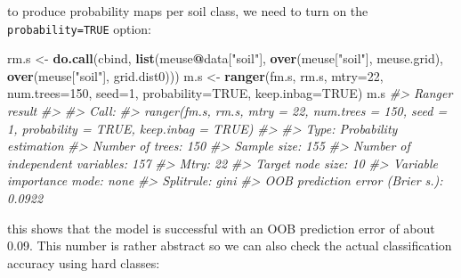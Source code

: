 \documentclass[graybox,natbib,nospthms,UStrade]{svmono}
\newenvironment{Shaded}{\begin{snugshade}}{\end{snugshade}}
\newcommand{\CommentTok}[1]{\textcolor[rgb]{0.37,0.37,0.37}{\textit{#1}}}
\newcommand{\DataTypeTok}[1]{\textcolor[rgb]{0.27,0.27,0.27}{#1}}
\newcommand{\DecValTok}[1]{\textcolor[rgb]{0.06,0.06,0.06}{#1}}
\newcommand{\KeywordTok}[1]{\textcolor[rgb]{0.27,0.27,0.27}{\textbf{#1}}}
\newcommand{\NormalTok}[1]{#1}
\newcommand{\OperatorTok}[1]{\textcolor[rgb]{0.43,0.43,0.43}{\textbf{#1}}}
\newcommand{\OtherTok}[1]{\textcolor[rgb]{0.37,0.37,0.37}{#1}}
\newcommand{\StringTok}[1]{\textcolor[rgb]{0.5,0.5,0.5}{#1}}
\begin{document}
to produce probability maps per soil class, we need to turn on the \texttt{probability=TRUE} option:

\begin{Shaded}
\begin{Highlighting}[]
\NormalTok{rm.s <-}\StringTok{ }\KeywordTok{do.call}\NormalTok{(cbind, }\KeywordTok{list}\NormalTok{(meuse}\OperatorTok{@}\NormalTok{data[}\StringTok{"soil"}\NormalTok{], }
                            \KeywordTok{over}\NormalTok{(meuse[}\StringTok{"soil"}\NormalTok{], meuse.grid), }
                            \KeywordTok{over}\NormalTok{(meuse[}\StringTok{"soil"}\NormalTok{], grid.dist0)))}
\NormalTok{m.s <-}\StringTok{ }\KeywordTok{ranger}\NormalTok{(fm.s, rm.s, }\DataTypeTok{mtry=}\DecValTok{22}\NormalTok{, }\DataTypeTok{num.trees=}\DecValTok{150}\NormalTok{, }\DataTypeTok{seed=}\DecValTok{1}\NormalTok{, }
              \DataTypeTok{probability=}\OtherTok{TRUE}\NormalTok{, }\DataTypeTok{keep.inbag=}\OtherTok{TRUE}\NormalTok{)}
\NormalTok{m.s}
\CommentTok{#> Ranger result}
\CommentTok{#> }
\CommentTok{#> Call:}
\CommentTok{#>  ranger(fm.s, rm.s, mtry = 22, num.trees = 150, seed = 1, probability = TRUE,      keep.inbag = TRUE) }
\CommentTok{#> }
\CommentTok{#> Type:                             Probability estimation }
\CommentTok{#> Number of trees:                  150 }
\CommentTok{#> Sample size:                      155 }
\CommentTok{#> Number of independent variables:  157 }
\CommentTok{#> Mtry:                             22 }
\CommentTok{#> Target node size:                 10 }
\CommentTok{#> Variable importance mode:         none }
\CommentTok{#> Splitrule:                        gini }
\CommentTok{#> OOB prediction error (Brier s.):  0.0922}
\end{Highlighting}
\end{Shaded}

this shows that the model is successful with an OOB prediction error of about 0.09. This number is rather abstract so we can also check the actual classification accuracy using hard classes:

\begin{Shaded}
\end{Shaded}
\end{document}
